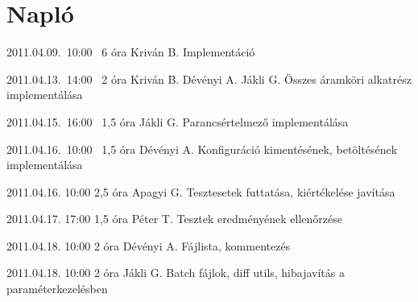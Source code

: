 %
\section{Napló}

\begin{naplo}

\bejegyzes
{2011.04.09.~10:00~} %
{6 óra} %
{Kriván B.} %
{Implementáció} %

\bejegyzes
{2011.04.13.~14:00~} %
{2 óra} %
{Kriván B.\newline
Dévényi A.\newline
Jákli G.} %
{Összes áramköri alkatrész implementálása} %

\bejegyzes
{2011.04.15.~16:00~} %
{1,5 óra} %
{Jákli G.} %
{Parancsértelmező implementálása} %

\bejegyzes
{2011.04.16.~10:00~} %
{1,5 óra} %
{Dévényi A.} %
{Konfiguráció kimentésének, betöltésének implementálása} %

\bejegyzes
{2011.04.16. 10:00} %
{2,5 óra} %
{Apagyi G.} %
{Tesztesetek futtatása, kiértékelése javítása} %

\bejegyzes
{2011.04.17. 17:00} %
{1,5 óra} %
{Péter T.} %
{Tesztek eredményének ellenőrzése} %

\bejegyzes
{2011.04.18. 10:00} %
{2 óra} %
{Dévényi A.} %
{Fájlista, kommentezés} %

\bejegyzes
{2011.04.18. 10:00} %
{2 óra} %
{Jákli G.} %
{Batch fájlok, diff utils, hibajavítás a paraméterkezelésben} %


\end{naplo}

